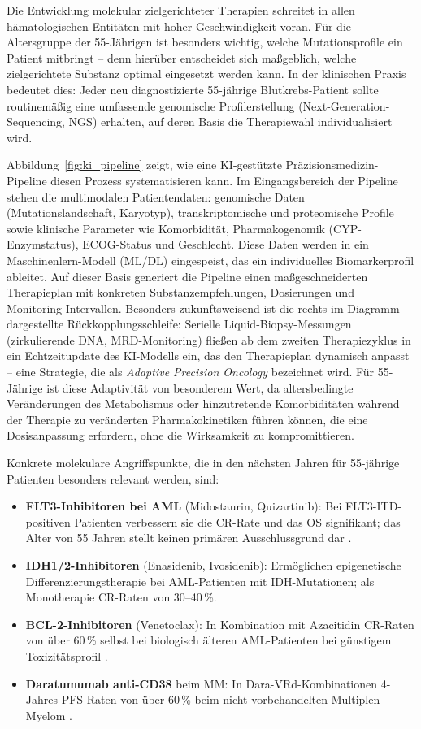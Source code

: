 ﻿\documentclass[12pt,a4paper]{article}
\theoremstyle{definition}
\begin{document}
Die Entwicklung molekular zielgerichteter Therapien schreitet in allen hämatologischen
Entitäten mit hoher Geschwindigkeit voran. Für die Altersgruppe der 55-Jährigen ist
besonders wichtig, welche Mutationsprofile ein Patient mitbringt -- denn hierüber
entscheidet sich maßgeblich, welche zielgerichtete Substanz optimal eingesetzt werden
kann. In der klinischen Praxis bedeutet dies: Jeder neu diagnostizierte 55-jährige
Blutkrebs-Patient sollte routinemäßig eine umfassende genomische Profilerstellung
(Next-Generation-Sequencing, NGS) erhalten, auf deren Basis die Therapiewahl
individualisiert wird.

Abbildung~\ref{fig:ki_pipeline} zeigt, wie eine KI-gestützte Präzisionsmedizin-Pipeline
diesen Prozess systematisieren kann. Im Eingangsbereich der Pipeline stehen die
multimodalen Patientendaten: genomische Daten (Mutationslandschaft, Karyotyp),
transkriptomische und proteomische Profile sowie klinische Parameter wie Komorbidität,
Pharmakogenomik (CYP-Enzymstatus), ECOG-Status und Geschlecht. Diese Daten werden
in ein Maschinenlern-Modell (ML/DL) eingespeist, das ein individuelles Biomarkerprofil
ableitet. Auf dieser Basis generiert die Pipeline einen maßgeschneiderten Therapieplan
mit konkreten Substanzempfehlungen, Dosierungen und Monitoring-Intervallen. Besonders
zukunftsweisend ist die rechts im Diagramm dargestellte Rückkopplungsschleife: Serielle
Liquid-Biopsy-Messungen (zirkulierende DNA, MRD-Monitoring) fließen ab dem zweiten
Therapiezyklus in ein Echtzeitupdate des KI-Modells ein, das den Therapieplan dynamisch
anpasst -- eine Strategie, die als \emph{Adaptive Precision Oncology} bezeichnet wird.
Für 55-Jährige ist diese Adaptivität von besonderem Wert, da altersbedingte Veränderungen
des Metabolismus oder hinzutretende Komorbiditäten während der Therapie zu veränderten
Pharmakokinetiken führen können, die eine Dosisanpassung erfordern, ohne die Wirksamkeit
zu kompromittieren.

Konkrete molekulare Angriffspunkte, die in den nächsten Jahren für 55-jährige Patienten
besonders relevant werden, sind:
\begin{itemize}
  \item \textbf{FLT3-Inhibitoren bei AML} (Midostaurin, Quizartinib): Bei
        FLT3-ITD-positiven Patienten verbessern sie die CR-Rate und das OS signifikant;
        das Alter von 55 Jahren stellt keinen primären Ausschlussgrund dar
        \cite{dohner2017}.
  \item \textbf{IDH1/2-Inhibitoren} (Enasidenib, Ivosidenib): Ermöglichen
        epigenetische Differenzierungstherapie bei AML-Patienten mit IDH-Mutationen;
        als Monotherapie CR-Raten von 30--40\,\%.
  \item \textbf{BCL-2-Inhibitoren} (Venetoclax): In Kombination mit Azacitidin
        CR-Raten von über 60\,\% selbst bei biologisch älteren AML-Patienten bei
        günstigem Toxizitätsprofil \cite{fenaux2009}.
  \item \textbf{Daratumumab anti-CD38} beim MM: In Dara-VRd-Kombinationen
        4-Jahres-PFS-Raten von über 60\,\% beim nicht vorbehandelten Multiplen
        Myelom \cite{kumar2017}.
\end{itemize}
\end{document}
